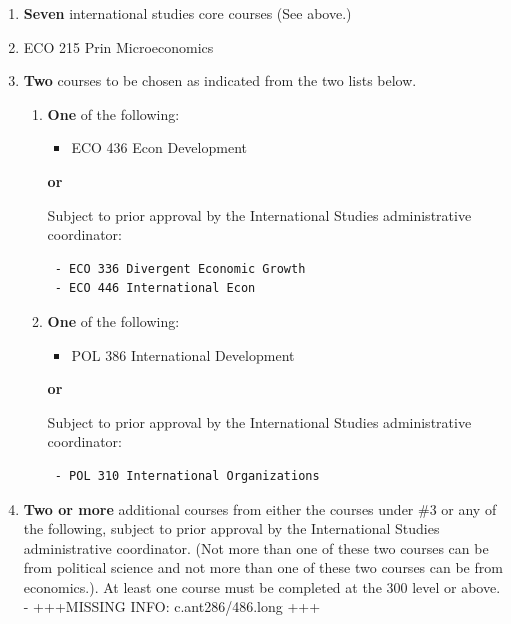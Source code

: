 \documentclass[
  letterpaper,
]{scrbook}
\providecommand{\tightlist}{%
  \setlength{\itemsep}{0pt}\setlength{\parskip}{0pt}}
\begin{document}
\begin{enumerate}
\def\labelenumi{\arabic{enumi}.}
\item
  \textbf{Seven} international studies core courses (See above.)
\item
  ECO 215 Prin Microeconomics
\item
  \textbf{Two} courses to be chosen as indicated from the two lists
  below.

  \begin{enumerate}
  \def\labelenumii{\alph{enumii}.}
  \item
    \textbf{One} of the following:

    \begin{itemize}
    \tightlist
    \item
      ECO 436 Econ Development
    \end{itemize}

    \textbf{or}

    Subject to prior approval by the International Studies
    administrative coordinator:

\begin{verbatim}
 - ECO 336 Divergent Economic Growth
 - ECO 446 International Econ
\end{verbatim}
  \item
    \textbf{One} of the following:

    \begin{itemize}
    \tightlist
    \item
      POL 386 International Development
    \end{itemize}

    \textbf{or}

    Subject to prior approval by the International Studies
    administrative coordinator:

\begin{verbatim}
 - POL 310 International Organizations
\end{verbatim}
  \end{enumerate}
\item
  \textbf{Two or more} additional courses from either the courses under
  \#3 or any of the following, subject to prior approval by the
  International Studies administrative coordinator. (Not more than one
  of these two courses can be from political science and not more than
  one of these two courses can be from economics.). At least one course
  must be completed at the 300 level or above. - +++MISSING INFO:
  c.ant286/486.long +++


\end{enumerate}
\end{document}
